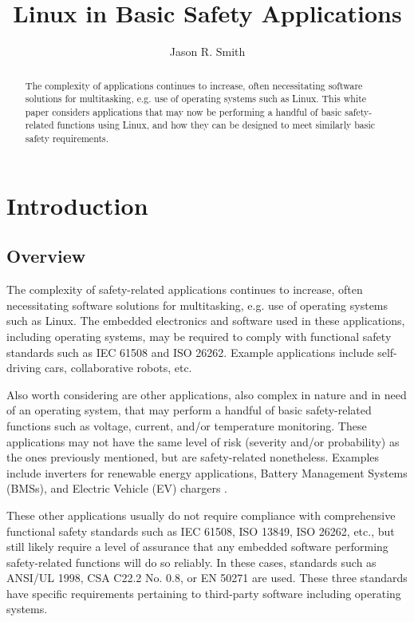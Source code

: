 \documentclass[12pt]{../Common_files/ElisaPaper}
\title{Linux in Basic Safety Applications}
\author{Jason R. Smith}
\begin{document}
	
\maketitle	
\begin{abstract}
The complexity of applications continues to increase, often necessitating software solutions for multitasking, e.g. use of operating systems such as Linux.  This white paper considers applications that may now be performing a handful of basic safety-related functions using Linux, and how they can be designed to meet similarly basic safety requirements.
\end{abstract}

\tableofcontents

\section{Introduction}
\subsection{Overview}
The complexity of safety-related applications continues to increase, often necessitating software solutions for multitasking, e.g. use of operating systems such as Linux.  
The embedded electronics and software used in these applications, including operating systems, may be required to comply with functional safety standards such as IEC 61508 and ISO 26262.  Example applications include self-driving cars, collaborative robots, etc.  

Also worth considering are other applications, also complex in nature and in need of an operating system, that may perform a handful of basic safety-related functions such as voltage, current, and/or temperature monitoring.  
These applications may not have the same level of risk (severity and/or probability) as the ones previously mentioned, but are safety-related nonetheless.  
Examples include inverters for renewable energy applications, Battery Management Systems (BMSs), and Electric Vehicle (EV) chargers .

These other applications usually do not require compliance with comprehensive functional safety standards such as IEC 61508, ISO 13849, ISO 26262, etc., but still likely require a level of assurance that any embedded software performing safety-related functions will do so reliably.  
In these cases, standards such as ANSI/UL 1998, CSA C22.2 No. 0.8, or EN 50271 are used.  
These three standards have specific requirements pertaining to third-party software including operating systems.
\end{document}

